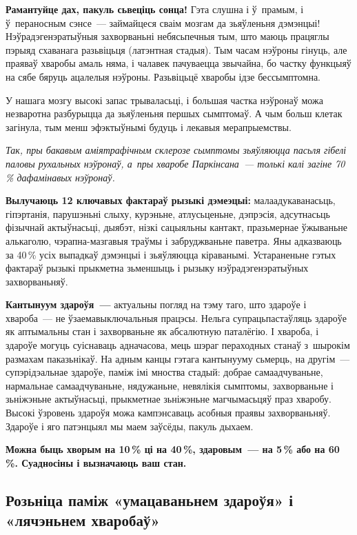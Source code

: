 \textbf{Рамантуйце дах, пакуль сьвеціць сонца!} Гэта слушна і ў~прамым, і ў~пераносным сэнсе~--- займайцеся сваім мозгам да зьяўленьня дэмэнцыі! Нэўрадэгенэратыўныя захворваньні небясьпечныя тым, што маюць працяглы пэрыяд схаванага разьвіцьця (латэнтная стадыя). Тым часам нэўроны гінуць, але праяваў хваробы амаль няма, і чалавек пачуваецца звычайна, бо частку функцыяў на сябе бяруць ацалелыя нэўроны. Разьвіцьцё хваробы ідзе бессымптомна.

У нашага мозгу высокі запас трываласьці, і большая частка нэўронаў можа незваротна разбурыцца да зьяўленьня першых сымптомаў. А чым больш клетак загінула, тым менш эфэктыўнымі будуць і лекавыя мерапрыемствы. 

\emph{Так, пры бакавым аміятрафічным склерозе сымптомы зьяўляюцца пасьля гібелі паловы рухальных нэўронаў, а~пры хваробе Паркінсана~--- толькі калі загіне 70\,\% дафамінавых нэўронаў.}

\textbf{Вылучаюць 12 ключавых фактараў рызыкі дэмеэцыі:} малаадукаванасьць, гіпэртанія, парушэньні слыху, курэньне, атлусьценьне, дэпрэсія, адсутнасьць фізычнай актыўнасьці, дыябэт, нізкі сацыяльны кантакт, празьмернае ўжываньне алькаголю, чэрапна-мазгавыя траўмы і забруджваньне паветра. Яны адказваюць за 40\,\% усіх выпадкаў дэмэнцыі і зьяўляюцца кіраванымі. Устараненьне гэтых фактараў рызыкі прыкметна зьменшыць і рызыку нэўрадэгенэратыўных захворваньняў.

\textbf{Кантынуум здароўя~---} актуальны погляд на тэму таго, што здароўе і хвароба~--- не ўзаемавыключальныя працэсы. Нельга супрацьпастаўляць здароўе як аптымальны стан і захворваньне як абсалютную паталёгію. І хвароба, і здароўе могуць суіснаваць адначасова, мець шэраг пераходных станаў з~шырокім размахам паказьнікаў. На адным канцы гэтага кантынууму сьмерць, на другім~--- супэрідэальнае здароўе, паміж імі мноства стадый: добрае самаадчуваньне, нармальнае самаадчуваньне, нядужаньне, невялікія сымптомы, захворваньне і зьніжэньне актыўнасьці, прыкметнае зьніжэньне магчымасьцяў праз хваробу. Высокі ўзровень здароўя можа кампэнсаваць асобныя праявы захворваньняў. Здароўе і яго патэнцыял мы маем заўсёды, пакуль дыхаем. 

\textbf{Можна быць хворым на 10\,\% ці на 40\,\%, здаровым~--- на 5\,\% або на 60\,\%. Суадносіны і вызначаюць ваш стан.}

\subsection*{Розьніца паміж «умацаваньнем здароўя» і «лячэньнем хваробаў»} 

